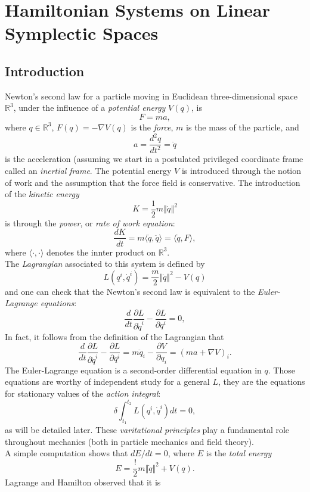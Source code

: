\chapter{Hamiltonian Systems on Linear Symplectic Spaces}

\section{Introduction}

\qquad Newton's second law for a particle moving in Euclidean three-dimensional space $\mathbb R^3$, under the influence of a \emph{potential energy} $V(q)$, is
$$
F=ma,
$$
where $q\in \mathbb R^3$, $F(q)=-\nabla V(q)$ is the \emph{force}, $m$ is the mass of the particle, and
$$
a=\frac{d^2q}{dt^2}=\ddot q
$$
is the acceleration (assuming we start in a postulated privileged coordinate frame called an \emph{inertial frame}. The potential energy $V$ is introduced through the notion of work and the assumption that the force field is conservative. The introduction of the \emph{kinetic energy}
$$
K=\frac{1}2 m \left\Vert \dot q\right\Vert^2 
$$
is through the \emph{power}, or \emph{rate of work equation}:
$$
\frac{dK}{dt}=m\langle \dot q, \ddot q\rangle=\langle \dot q, F\rangle,
$$
where $\langle \cdot, \cdot \rangle$ denotes the innter product on $\mathbb R^3$.\\

The \emph{Lagrangian} associated to this system is defined by
$$
L(q^i, \dot q^i)=\frac{m}2 \Vert \dot q\Vert^2-V(q)
$$
and one can check that the Newton's second law is equivalent to the \emph{Euler-Lagrange equations}:
$$
\frac{d}{dt} \frac{\partial L}{\partial \dot q^i}-\frac{\partial L}{\partial q^i}=0,
$$
In fact, it follows from the definition of the Lagrangian that
$$
\frac{d}{dt} \frac{\partial L}{\partial \dot q^i}-\frac{\partial L}{\partial q^i}=m\ddot q_i-\frac{\partial V}{\partial q_i}=(ma+\nabla V)_i.
$$
The Euler-Lagrange equation is a second-order differential equation in $q$. Those equations are worthy of independent study for a general $L$, they are the equations for stationary values of the \emph{action integral}:
$$
\delta \int_{t_1}^{t_2}L(q^i, \dot q^i)dt=0,
$$
as will be detailed later. These \emph{varitational principles} play a fundamental role throughout mechanics (both in particle mechanics and field theory).\\

A simple computation shows that $dE/dt=0$, where $E$ is the \emph{total energy}
$$
E=\frac{!}2m\Vert \dot q\Vert^2+V(q).
$$
Lagrange and Hamilton observed that it is 